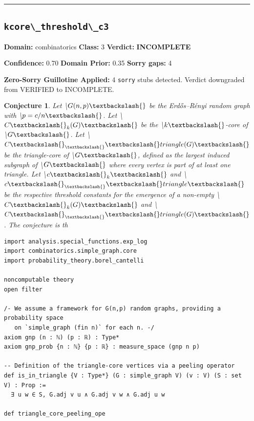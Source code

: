 \documentclass[12pt,a4paper]{article}
\newtheorem{conjecture}{Conjecture}
\begin{document}
\hrule\medskip

\subsection*{\texttt{kcore\textbackslash{}_threshold\textbackslash{}_c3}}

\textbf{Domain:} combinatorics \quad \textbf{Class:} 3 \quad \textbf{Verdict:} \textcolor{incompleteamber}{\textbf{INCOMPLETE}}

\textbf{Confidence:} 0.70 \quad \textbf{Domain Prior:} 0.35 \quad \textbf{Sorry gaps:} 4

\textcolor{sorryred}{\textbf{Zero-Sorry Guillotine Applied:} 4 \texttt{sorry} stubs detected. Verdict downgraded from VERIFIED to INCOMPLETE.}

\begin{conjecture}
Let \textbackslash{}$G(n, p)\textbackslash{}$ be the Erdős–Rényi random graph with \textbackslash{}$p=c/n\textbackslash{}$. Let \textbackslash{}$C\textbackslash{}_k(G)\textbackslash{}$ be the \textbackslash{}$k\textbackslash{}$-core of \textbackslash{}$G\textbackslash{}$. Let \textbackslash{}$C\textbackslash{}_\textbackslash{}\textbackslash{}triangle(G)\textbackslash{}$ be the triangle-core of \textbackslash{}$G\textbackslash{}$, defined as the largest induced subgraph of \textbackslash{}$G\textbackslash{}$ where every vertex is part of at least one triangle. Let \textbackslash{}$c\textbackslash{}_k\textbackslash{}$ and \textbackslash{}$c\textbackslash{}_\textbackslash{}\textbackslash{}triangle\textbackslash{}$ be the respective threshold constants for the emergence of a non-empty \textbackslash{}$C\textbackslash{}_k(G)\textbackslash{}$ and \textbackslash{}$C\textbackslash{}_\textbackslash{}\textbackslash{}triangle(G)\textbackslash{}$. The conjecture is th
\end{conjecture}

\begin{lstlisting}[caption={Lean 4 Sketch (v14 Galois)}]
import analysis.special_functions.exp_log
import combinatorics.simple_graph.core
import probability_theory.borel_cantelli

noncomputable theory
open filter

/- We assume a framework for G(n,p) random graphs, providing a probability space
   on `simple_graph (fin n)` for each n. -/
axiom gnp (n : ℕ) (p : ℝ) : Type*
axiom gnp_prob {n : ℕ} {p : ℝ} : measure_space (gnp n p)

-- Definition of the triangle-core vertices via a peeling operator
def is_in_triangle {V : Type*} (G : simple_graph V) (v : V) (S : set V) : Prop :=
  ∃ u w ∈ S, G.adj v u ∧ G.adj v w ∧ G.adj u w

def triangle_core_peeling_ope
\end{lstlisting}
\end{document}
